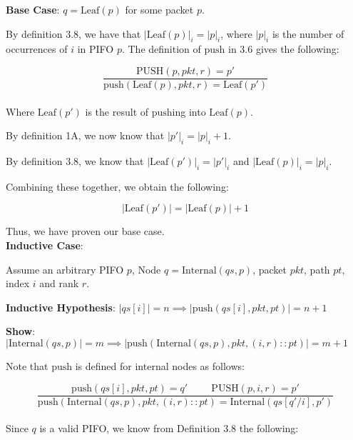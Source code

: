 \documentclass{article}
\begin{document}
\noindent \textbf{Base Case}: $q = \text{Leaf}(p)$ for some packet $p$.\newline

\noindent By definition 3.8, we have that $|\text{Leaf}(p)|_i = |p|_i$, where $|p|_i$ is the number of occurrences of $i$ in PIFO $p$. The definition of $\text{push}$ in 3.6 gives the following:

$$\frac{\text{PUSH}(p, pkt, r) = p'}{\text{push}(\text{Leaf}(p), pkt, r) = \text{Leaf}(p')}$$\\[-10pt]

\noindent Where $\text{Leaf}(p')$ is the result of $\text{push}$ing into $\text{Leaf}(p)$.\newline

\noindent By definition 1A, we now know that $|p'|_i = |p|_i + 1$.\newline

\noindent By definition 3.8, we know that $|\text{Leaf}(p')|_i = |p'|_i$ and $|\text{Leaf}(p)|_i = |p|_i$.\newline

\noindent Combining these together, we obtain the following:

$$|\text{Leaf}(p')| = |\text{Leaf}(p)| + 1$$

\noindent Thus, we have proven our base case.\\[10pt]

\noindent \textbf{Inductive Case}:\newline

\noindent Assume an arbitrary PIFO $p$, Node $q = \text{Internal}(qs, p)$, packet $pkt$, path $pt$, index $i$ and rank $r$.\newline

\noindent \textbf{Inductive Hypothesis}: $|qs[i]| = n \implies |\text{push}(qs[i], pkt, pt)| = n+1$\newline

\noindent \textbf{Show}: $|\text{Internal}(qs, p)| = m \implies |\text{push}(\text{Internal}(qs, p), pkt, (i, r) :: pt)| = m+1$\newline

\noindent Note that $\text{push}$ is defined for internal nodes as follows:

$$\frac{\text{push}(qs[i], pkt, pt) = q' \hspace{1cm} \text{PUSH}(p, i, r) = p'}{\text{push}(\text{Internal}(qs, p), pkt, (i, r) :: pt) = \text{Internal}(qs[q'/i], p')}$$\\[-10pt]

\noindent Since $q$ is a valid PIFO, we know from Definition 3.8 the following:
\end{document}
